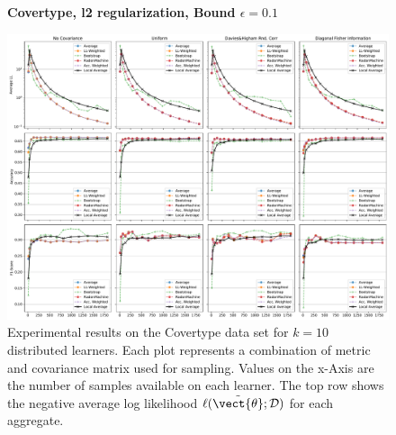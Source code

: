     \begin{landscape}
        \begin{figure}
            \centering
            \textbf{Covertype, l2 regularization, Bound $\epsilon=0.1$}\par\medskip
            \includegraphics[height=\dimexpr \textheight - 4\baselineskip\relax]{kapitel/figures/covertype_l2_0.1.pdf}
            \caption[Covertype plots with l2 regularization and $\epsilon=0.1$]{Experimental results on the Covertype data set for $k=10$ distributed learners. Each plot represents a combination of metric and covariance matrix used for sampling. Values on the x-Axis are the number of samples available on each learner. The top row shows the negative average log likelihood $\ell(\tilde{\vect{\theta}}; \mathcal{D})$ for each aggregate.}
            \label{fig:analysis9}
        \end{figure}
    \end{landscape}

